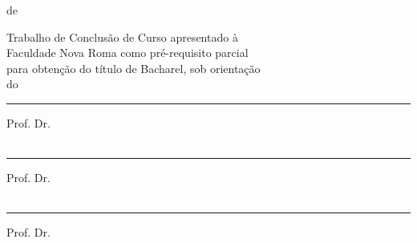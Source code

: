 \documentclass{tcc}
\begin{document}
\vfill
\begin{center}
\MONTH  de \the\year
\end{center}

\newpage
\begin{center}
\Large{\bf \MakeUppercase{\theauthor}}
\end{center}
\vspace{3in}
\begin{center}
\LARGE{\bf \thetitle}
\end{center}

\vspace{0.05in}

\begin{flushright}
Trabalho de Conclusão de Curso apresentado à\\ Faculdade Nova Roma como pré-requisito parcial\\ para obtenção do título de Bacharel, sob orientação\\ do \orientador
\end{flushright}

\vspace{0.7in}

\hrule
\noindent Prof. Dr. \profa\\
\insta\\

\vspace{0.25in}

\hrule
\noindent Prof. Dr. \profb\\
\instb\\

\vspace{0.25in}

\hrule
\noindent Prof. Dr. \profc\\
\instc\\


\newpage



\newpage



\newpage

\renewcommand{\listfigurename}{\centering LISTA DE FIGURAS}
\listoffigures
\newpage

\renewcommand{\listtablename}{\centering LISTA DE TABELAS}
\listoftables
\newpage



\newpage


\pagestyle{plain} %
\tableofcontents

\newpage









\nocite{*}
 

\end{document}
